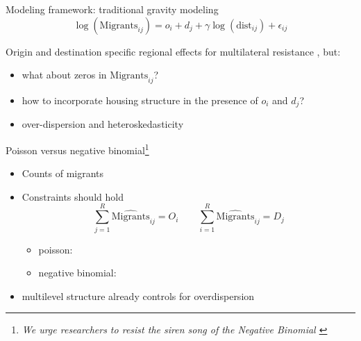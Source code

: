 \documentclass{beamer}
\begin{document}
\begin{frame}{Modeling framework: traditional gravity modeling}
	\begin{equation*}
	\log(\text{Migrants}_{ij}) = o_i + d_j + \gamma\log(\text{dist}_{ij}) + \epsilon_{ij}
	\label{eq:gravfixed}
	\end{equation*} 
	
	Origin and destination specific \alert{regional} effects for multilateral resistance  \citep{anderson2003gravity}, but:
	\begin{itemize}
		\item what about \alert{zeros} in $\text{Migrants}_{ij}$?
		\item how to incorporate \alert{housing} structure in the presence of $o_i$ and $d_j$?
		\item \alert{over-dispersion} and \alert{heteroskedasticity} \footnotesize{\citep{silva2006log} }
	\end{itemize}
\end{frame}

\begin{frame}{Poisson versus negative binomial\footnote{
			\emph{We urge researchers to resist the siren song of the Negative
			Binomial \footnotesize{ \citep{head2014gravity}} }
			}}
	
	\begin{itemize}
		\item Counts of migrants\newline 
		\item \alert{Constraints} should hold
		$$
		\sum_{j=1}^{R} {\widehat{\text{Migrants} }_{ij} } = O_i \qquad \sum_{i=1}^{R} {\widehat{\text{Migrants} }_{ij} } = D_j
		$$
		\begin{itemize}
			\item poisson: 
		    \item negative binomial:  \newline
		  \end{itemize}
		  \item multilevel structure already controls for overdispersion
		\end{itemize}

\end{frame}
\end{document}
